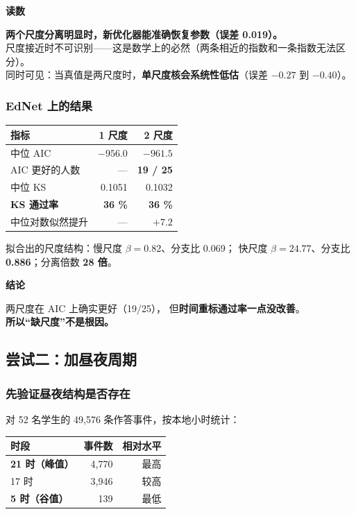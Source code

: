 \documentclass[UTF8,a4paper,11pt]{ctexart}
\newenvironment{explainbox}[1]
{\begin{center}\begin{minipage}{0.94\textwidth}\colorbox{boxbg}{\parbox{0.92\textwidth}{\textbf{#1}\par\vspace{2pt}}}}
{\end{minipage}\end{center}}
\newcommand{\hl}[1]{\textcolor{blue!70!black}{\textbf{#1}}}
\newcommand{\warn}[1]{\textcolor{red!70!black}{\textbf{#1}}}
\begin{document}
\begin{explainbox}{读数}
\textbf{两个尺度分离明显时，新优化器能准确恢复参数（误差 0.019）。}\\
尺度接近时不可识别——这是数学上的必然（两条相近的指数和一条指数无法区分）。\\[4pt]
同时可见：当真值是两尺度时，\textbf{单尺度核会系统性低估}（误差 $-0.27$ 到 $-0.40$）。
\end{explainbox}

\subsubsection{EdNet 上的结果}

\begin{center}
\begin{tabular}{p{4.6cm}rr}
\toprule
\textbf{指标} & \textbf{1 尺度} & \textbf{2 尺度} \\
\midrule
中位 AIC & $-956.0$ & \hl{$-961.5$} \\
AIC 更好的人数 & --- & \hl{19 / 25} \\
中位 KS & 0.1051 & 0.1032 \\
\textbf{KS 通过率} & \textbf{36 \%} & \warn{\textbf{36 \%}} \\
中位对数似然提升 & --- & $+7.2$ \\
\bottomrule
\end{tabular}
\end{center}

拟合出的尺度结构：慢尺度 $\beta=0.82$、分支比 0.069；
快尺度 $\beta=24.77$、分支比 \textbf{0.886}；分离倍数 \textbf{28 倍}。

\begin{explainbox}{结论}
两尺度在 AIC 上确实更好（19/25），
但\textbf{时间重标通过率一点没改善}。\\[4pt]
\textbf{所以“缺尺度”不是根因。}
\end{explainbox}

\subsection{尝试二：加昼夜周期}

\subsubsection{先验证昼夜结构是否存在}

对 52 名学生的 49,576 条作答事件，按本地小时统计：

\begin{center}
\begin{tabular}{p{6.0cm}rr}
\toprule
\textbf{时段} & \textbf{事件数} & \textbf{相对水平} \\
\midrule
\textbf{21 时（峰值）} & 4,770 & 最高 \\
17 时 & 3,946 & 较高 \\
\textbf{5 时（谷值）} & 139 & 最低 \\
\bottomrule
\end{tabular}
\end{center}
\end{document}

